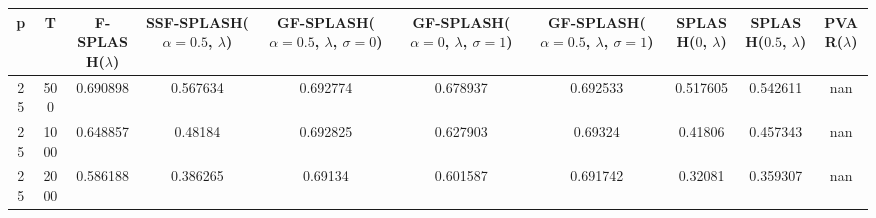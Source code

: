 \begin{tabular}{cccccccccc}
\hline
  p  &  T   &  F-SPLASH($\lambda$)  &  SSF-SPLASH($\alpha=0.5$, $\lambda$)  &  GF-SPLASH($\alpha=0.5$, $\lambda$, $\sigma=0$)  &  GF-SPLASH($\alpha=0$, $\lambda$, $\sigma=1$)  &  GF-SPLASH($\alpha=0.5$, $\lambda$, $\sigma=1$)  &  SPLASH($0$, $\lambda$)  &  SPLASH($0.5$, $\lambda$)  &  PVAR($\lambda$)  \\
\hline
 25  & 500  &       0.690898        &               0.567634                &                     0.692774                     &                    0.678937                    &                     0.692533                     &         0.517605         &          0.542611          &        nan        \\
 25  & 1000 &       0.648857        &                0.48184                &                     0.692825                     &                    0.627903                    &                     0.69324                      &         0.41806          &          0.457343          &        nan        \\
 25  & 2000 &       0.586188        &               0.386265                &                     0.69134                      &                    0.601587                    &                     0.691742                     &         0.32081          &          0.359307          &        nan        \\
\hline
\end{tabular}